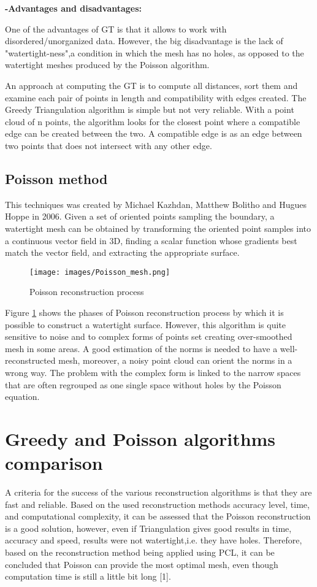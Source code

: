 \documentclass[a4paper]{report}
\begin{document}
\textbf{-Advantages and disadvantages:}

One of the advantages of GT is that it allows to work with
disordered/unorganized data. However, the big disadvantage is the lack of "watertight-ness",a condition in which the mesh has no holes, as opposed to the watertight meshes produced by the Poisson algorithm.\cite{proj2}

An approach at computing the GT is to compute all distances, sort them and examine
each pair of points in length and compatibility with edges created. The Greedy Triangulation algorithm is simple but not very reliable. With a point cloud of n points, the algorithm looks for the closest point where a compatible edge can be
created between the two. A compatible edge is as an edge between two
points that does not intersect with any other edge.\cite{proj3}
\subsection{Poisson method}
This techniques was created by Michael Kazhdan, Matthew Bolitho and Hugues Hoppe in
2006. Given a set of oriented points sampling the boundary, a watertight mesh can be obtained by transforming the oriented point samples into a continuous vector field in 3D, finding a scalar function whose gradients best match the vector field, and extracting the appropriate surface.\cite{proj2}
\begin{figure}[h]
\centering
\texttt{[image: images/Poisson\_mesh.png]}
\caption{Poisson reconstruction process \cite{proj2}}
\label{Poisson_mesh}
\end{figure}

Figure \ref{Poisson_mesh} shows the phases of Poisson reconstruction process by which it is possible to construct a watertight surface. However, this algorithm is quite sensitive to noise and to complex forms of points set creating over-smoothed mesh in some areas. A good estimation of the norms is needed to have a well-reconstructed mesh, moreover, a noisy point cloud can orient the norms in a wrong way. The problem with the complex form is linked to the narrow spaces that are often regrouped as one single space without holes by the Poisson equation.
\section{Greedy and Poisson algorithms comparison}
A criteria for the success of the various reconstruction algorithms is that they are
fast and reliable. Based on the used reconstruction methods accuracy level, time, and computational complexity, it can be assessed that the Poisson reconstruction is a good solution, however, even if Triangulation gives good results in time, accuracy and
speed, results were not watertight,i.e. they have holes. Therefore, based on the reconstruction method being applied using PCL, it can be concluded that Poisson can provide the most optimal mesh, even though computation time is still a little bit long [1].
\end{document}
